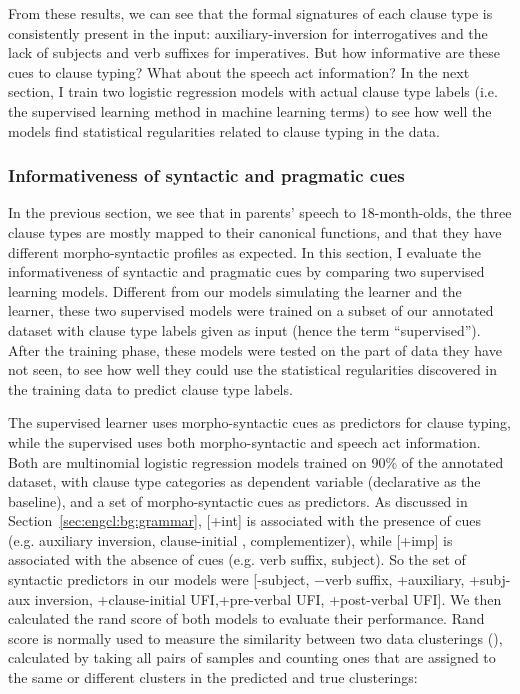 From these results, we can see that the formal signatures of each clause type is consistently present in the input: auxiliary-inversion for interrogatives and the lack of subjects and verb suffixes for imperatives. But how informative are these cues to clause typing? What about the speech act information? In the next section, I train two logistic regression models with actual clause type labels (i.e. the supervised learning method in machine learning terms) to see how well the models find statistical regularities related to clause typing in the data. 


\subsubsection{Informativeness of syntactic and pragmatic cues}
\label{sec:engcl:corpus:supervised}
In the previous section, we see that in parents' speech to 18-month-olds, the three clause types are mostly mapped to their canonical functions, and that they have different morpho-syntactic profiles as expected. In this section, I evaluate the informativeness of syntactic and pragmatic cues by comparing two supervised learning models. Different from our models simulating the \dlearnerabbr{} learner and the \plearnerabbr{} learner, these two supervised models were trained on a subset of our annotated dataset with clause type labels given as input (hence the term ``supervised''). After the training phase, these models were tested on the part of data they have not seen, to see how well they could use the statistical regularities discovered in the training data to predict clause type labels. 

The supervised \dlearnerabbr{} learner uses morpho-syntactic cues as predictors for clause typing, while the supervised \plearnerabbr{} uses both morpho-syntactic and speech act information. Both are multinomial logistic regression models trained on 90\% of the annotated dataset, with clause type categories as dependent variable (declarative as the baseline), and a set of morpho-syntactic cues as predictors. As discussed in Section~\ref{sec:engcl:bg:grammar}, [+int] is associated with the presence of cues (e.g. auxiliary inversion, clause-initial \twh{}, complementizer), while [+imp] is associated with the absence of cues (e.g. verb suffix, subject). So the set of syntactic predictors in our models were [-subject, $-$verb suffix, +auxiliary, +subj-aux inversion, +clause-initial UFI,+pre-verbal UFI, +post-verbal UFI]. We then calculated the rand score of both models to evaluate their performance. Rand score is normally used to measure the similarity between two data clusterings (\cite{rand1971}), calculated by taking all pairs of samples and counting ones that are assigned to the same or different clusters in the predicted and true clusterings:

